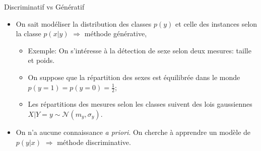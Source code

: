 \documentclass[8pt]{beamer}
\begin{document}
			\begin{frame}{Discriminatif vs Génératif}
				\begin{itemize}
					\item<1-> On sait modéliser la distribution des classes $p(y)$ et celle des instances selon la classe $p(x\vert y)$ $\Longrightarrow$ méthode générative,
						\begin{itemize}
							\item<2-> Exemple: On s'intéresse à la détection de sexe selon deux mesures: taille et poids.
							\item<3-> On suppose que la répartition des sexes est équilibrée dans le monde $p(y=1) = p(y=0) = \frac{1}{2}$;
							\item<4-> Les répartitions des mesures selon les classes suivent des lois gaussiennes $X\vert Y=y \sim \mathscr{N}(m_y, \sigma_y)$.
						\end{itemize}
					\item<5-> On n'a aucune connaissance \textit{a priori}. On cherche à apprendre un modèle de $p(y \vert x)$ $\Longrightarrow$ méthode discriminative.
				\end{itemize}
			\end{frame}
\end{document}
